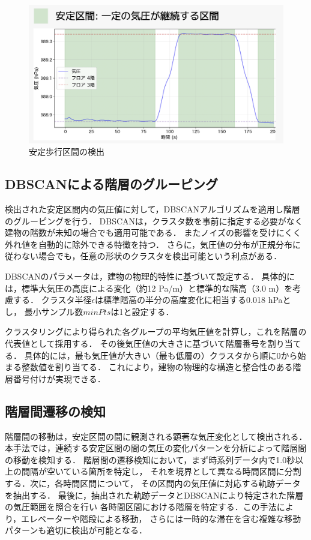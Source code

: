 \begin{figure}[h]
	\centering
	\includegraphics[width=\linewidth]{../image/stable.jpg}
	\caption{安定歩行区間の検出}    \label{fig:stable_section}
\end{figure}

\subsection{DBSCANによる階層のグルーピング}
検出された安定区間内の気圧値に対して，DBSCANアルゴリズムを適用し階層のグルーピングを行う．
DBSCANは，クラスタ数を事前に指定する必要がなく建物の階数が未知の場合でも適用可能である．
またノイズの影響を受けにくく外れ値を自動的に除外できる特徴を持つ．
さらに，気圧値の分布が正規分布に従わない場合でも，任意の形状のクラスタを検出可能という利点がある．

DBSCANのパラメータは，建物の物理的特性に基づいて設定する．
具体的には，標準大気圧の高度による変化（約12 Pa/m）と標準的な階高（3.0 m）を考慮する．
クラスタ半径$\epsilon$は標準階高の半分の高度変化に相当する0.018 hPaとし，
最小サンプル数$minPts$は1と設定する．

クラスタリングにより得られた各グループの平均気圧値を計算し，これを階層の代表値として採用する．
その後気圧値の大きさに基づいて階層番号を割り当てる．
具体的には，最も気圧値が大きい（最も低層の）クラスタから順に0から始まる整数値を割り当てる．
これにより，建物の物理的な構造と整合性のある階層番号付けが実現できる．

\subsection{階層間遷移の検知}
階層間の移動は，安定区間の間に観測される顕著な気圧変化として検出される．
本手法では，連続する安定区間の間の気圧の変化パターンを分析によって階層間の移動を検知する．
階層間の遷移検知において，まず時系列データ内で1.0秒以上の間隔が空いている箇所を特定し，
それを境界として異なる時間区間に分割する．次に，各時間区間について，
その区間内の気圧値に対応する軌跡データを抽出する．
最後に，抽出された軌跡データとDBSCANにより特定された階層の気圧範囲を照合を行い
各時間区間における階層を特定する．この手法により，エレベーターや階段による移動，
さらには一時的な滞在を含む複雑な移動パターンも適切に検出が可能となる．

